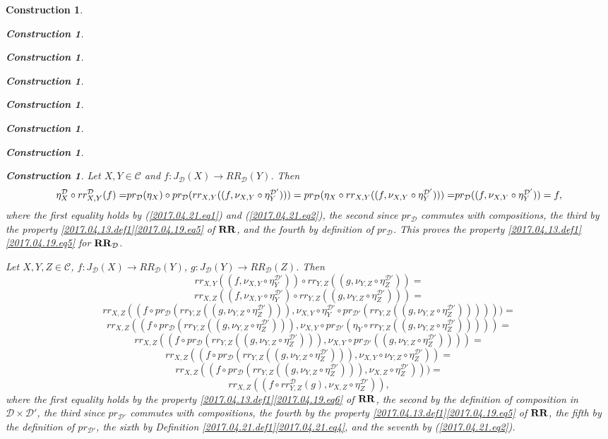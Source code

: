 \documentclass[12pt]{amsart}
\newenvironment{eq}{\begin{equation}}{\end{equation}}
\newtheorem{construction}[proposition]{Construction}
\newcommand{\llabel}[1]{\label{#1}}
\newcommand{\sr}{\rightarrow}
\newcommand{\RR}{{\bf RR}}
\newcommand{\C}{{\mathcal C}}
\newcommand{\D}{{\mathcal D}}
\begin{document}
\begin{construction}
\begin{construction}
\begin{construction}
\begin{construction}
\begin{construction}
\begin{construction}
\begin{construction}
\begin{construction}
Let $X,Y\in\C$ and $f:J_{\D}(X)\sr RR_{\D}(Y)$. Then
%
\begin{eq}
\llabel{2017.04.23.eq2}
\eta^{\D}_X\circ rr^{\D}_{X,Y}(f)=
$$$$pr_{\D}(\eta_X)\circ pr_{\D}(rr_{X,Y}((f,\nu_{X,Y}\circ \eta^{\D'}_Y)))=
pr_{\D}(\eta_X\circ rr_{X,Y}((f,\nu_{X,Y}\circ \eta^{\D'}_Y)))=
$$$$pr_{\D}((f,\nu_{X,Y}\circ \eta^{\D'}_Y))=
f,
\end{eq}%
%
where the first equality holds by (\ref{2017.04.21.eq1}) and
(\ref{2017.04.21.eq2}), the second since $pr_{\D}$ commutes with compositions,
the third by the property \ref{2017.04.13.def1}\ref{2017.04.19.eq5} of $\RR$,
and the fourth by definition of $pr_{\D}$. This proves the property
\ref{2017.04.13.def1}\ref{2017.04.19.eq5} for $\RR_{\D}$.

Let $X,Y,Z\in\C$, $f:J_{\D}(X)\sr RR_{\D}(Y)$, $g:J_{\D}(Y)\sr RR_{\D}(Z)$. Then
%
$$rr_{X,Y}((f,\nu_{X,Y}\circ \eta^{\D'}_Y))\circ 
rr_{Y,Z}((g,\nu_{Y,Z}\circ \eta^{\D'}_Z))=
%
$$$$rr_{X,Z}((f,\nu_{X,Y}\circ \eta^{\D'}_Y)\circ rr_{Y,Z}((g,\nu_{Y,Z}\circ \eta^{\D'}_Z)))=
%
$$$$rr_{X,Z}((f\circ pr_{\D}(rr_{Y,Z}((g,\nu_{Y,Z}\circ \eta^{\D'}_Z))),\nu_{X,Y}\circ\eta^{\D'}_Y\circ pr_{\D'}(rr_{Y,Z}((g,\nu_{Y,Z}\circ\eta^{\D'}_Z))) )))=
%
$$$$rr_{X,Z}((f\circ pr_{\D}(rr_{Y,Z}((g,\nu_{Y,Z}\circ \eta^{\D'}_Z))),\nu_{X,Y}\circ pr_{\D'}(\eta_Y\circ rr_{Y,Z}((g,\nu_{Y,Z}\circ\eta^{\D'}_Z))) ))=
%
$$$$rr_{X,Z}((f\circ pr_{\D}(rr_{Y,Z}((g,\nu_{Y,Z}\circ \eta^{\D'}_Z))),\nu_{X,Y}\circ pr_{\D'}((g,\nu_{Y,Z}\circ\eta^{\D'}_Z)) ))=
%
$$$$rr_{X,Z}((f\circ pr_{\D}(rr_{Y,Z}((g,\nu_{Y,Z}\circ \eta^{\D'}_Z))),\nu_{X,Y}\circ\nu_{Y,Z}\circ\eta^{\D'}_Z) )=
%
$$$$rr_{X,Z}((f\circ pr_{\D}(rr_{Y,Z}((g,\nu_{Y,Z}\circ \eta^{\D'}_Z))),\nu_{X,Z}\circ\eta^{\D'}_Z) ))=$$
%
\begin{eq}
\llabel{2017.04.21.eq5}
rr_{X,Z}((f\circ rr^{\D}_{Y,Z}(g),\nu_{X,Z}\circ\eta^{\D'}_Z)),
\end{eq}%
%
where the first equality holds by the property
\ref{2017.04.13.def1}\ref{2017.04.19.eq6} of $\RR$, the second by the
definition of composition in $\D\times\D'$, the third since $pr_{\D'}$ commutes
with compositions, the fourth by the property
\ref{2017.04.13.def1}\ref{2017.04.19.eq5} of $\RR$, the fifth by the definition
of $pr_{\D'}$, the sixth by Definition
\ref{2017.04.21.def1}\ref{2017.04.21.eq4}, and the seventh by
(\ref{2017.04.21.eq2}).


\end{construction}
\end{construction}
\end{construction}
\end{construction}
\end{construction}
\end{construction}
\end{construction}
\end{construction}
\end{document}
